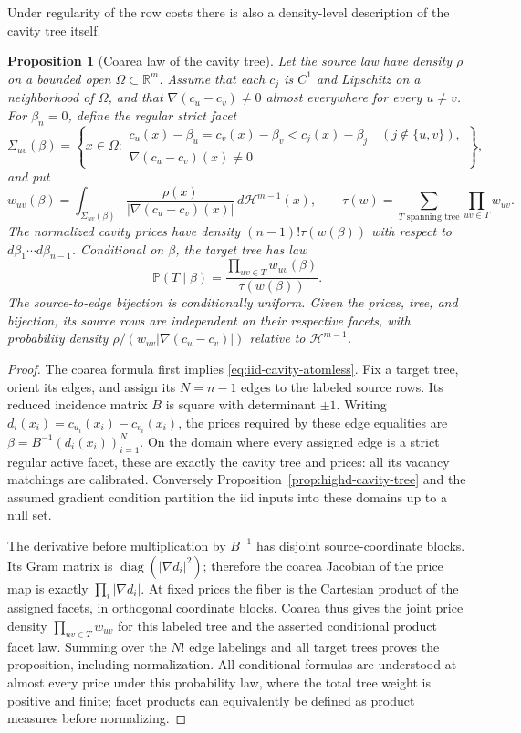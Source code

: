 \documentclass[11pt,reqno]{amsart}
\newtheorem{proposition}[theorem]{Proposition}
\theoremstyle{definition}
\theoremstyle{remark}
\numberwithin{equation}{section}
\newcommand{\R}{\mathbb R}
\newcommand{\Pp}{\mathbb P}
\begin{document}
Under regularity of the row costs there is also a density-level
description of the cavity tree itself.

\begin{proposition}[Coarea law of the cavity tree]
\label{prop:iid-cavity-coarea}
Let the source law have density \(\rho\) on a bounded open
\(\Omega\subset\R^m\). Assume that each \(c_j\) is \(C^1\) and
Lipschitz on a neighborhood of \(\Omega\), and that
\(\nabla(c_u-c_v)\ne0\) almost everywhere for every \(u\ne v\).
For \(\beta_n=0\), define the regular strict facet
\[
 \Sigma_{uv}(\beta)=\left\{x\in\Omega:
 \begin{array}{l}
 c_u(x)-\beta_u=c_v(x)-\beta_v
       <c_j(x)-\beta_j\quad(j\notin\{u,v\}),\\
 \nabla(c_u-c_v)(x)\ne0
 \end{array}\right\},
\]
and put
\[
 w_{uv}(\beta)=\int_{\Sigma_{uv}(\beta)}
      \frac{\rho(x)}{|\nabla(c_u-c_v)(x)|}\,
          d\mathcal H^{m-1}(x),\qquad
 \tau(w)=\sum_{T\text{ spanning tree}}\prod_{uv\in T}w_{uv}.
\]
The normalized cavity prices have density
\((n-1)!\tau(w(\beta))\) with respect to
\(d\beta_1\cdots d\beta_{n-1}\). Conditional on \(\beta\), the
target tree has law
\[
 \Pp(T\mid\beta)=\frac{\prod_{uv\in T}w_{uv}(\beta)}
                           {\tau(w(\beta))}.
\]
The source-to-edge bijection is conditionally uniform. Given the prices,
tree, and bijection, its source rows are independent on their respective
facets, with probability density
\(\rho/(w_{uv}|\nabla(c_u-c_v)|)\) relative to
\(\mathcal H^{m-1}\).
\end{proposition}

\begin{proof}
The coarea formula first implies
\eqref{eq:iid-cavity-atomless}. Fix a target tree, orient its edges,
and assign its \(N=n-1\) edges to the labeled source rows. Its reduced
incidence matrix \(B\) is square with determinant \(\pm1\).
Writing \(d_i(x_i)=c_{u_i}(x_i)-c_{v_i}(x_i)\), the prices required
by these edge equalities are
\(\beta=B^{-1}(d_i(x_i))_{i=1}^N\). On the domain where every
assigned edge is a strict regular active facet, these are exactly the
cavity tree and prices: all its vacancy matchings are calibrated.
Conversely Proposition~\ref{prop:highd-cavity-tree} and the assumed
gradient condition partition the iid inputs into these domains up to
a null set.

The derivative before multiplication by \(B^{-1}\) has disjoint
source-coordinate blocks. Its Gram matrix is
\(\operatorname{diag}(|\nabla d_i|^2)\); therefore the coarea
Jacobian of the price map is exactly \(\prod_i|\nabla d_i|\).
At fixed prices the fiber is the Cartesian product of the assigned
facets, in orthogonal coordinate blocks. Coarea thus gives the joint
price density \(\prod_{uv\in T}w_{uv}\) for this labeled tree and
the asserted conditional product facet law. Summing over the \(N!\)
edge labelings and all target trees proves the proposition, including
normalization. All conditional formulas are understood at almost every
price under this probability law, where the total tree weight is
positive and finite; facet products can equivalently be defined as
product measures before normalizing.
\end{proof}
\end{document}
